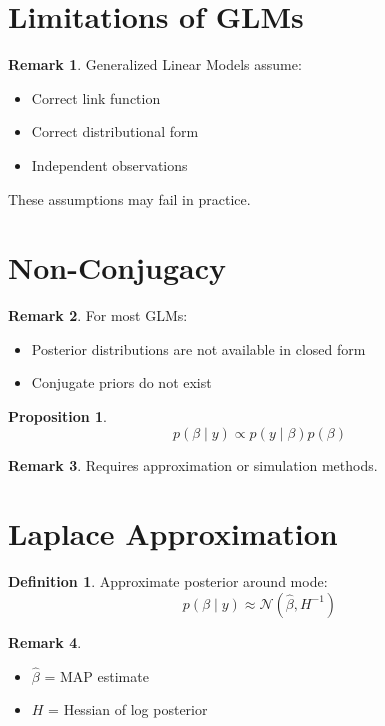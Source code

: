 \documentclass[12pt,oneside]{book}
\numberwithin{equation}{section}
\theoremstyle{definition}
\newtheorem{definition}{Definition}[section]
\newtheorem{remark}{Remark}[section]
\theoremstyle{plain}
\newtheorem{proposition}{Proposition}[section]
\theoremstyle{remark}
\newcommand{\Normal}{\mathcal{N}}
\begin{document}
\section{Limitations of GLMs}

\begin{remark}
Generalized Linear Models assume:
\begin{itemize}
\item Correct link function
\item Correct distributional form
\item Independent observations
\end{itemize}

These assumptions may fail in practice.
\end{remark}

\section{Non-Conjugacy}

\begin{remark}
For most GLMs:
\begin{itemize}
\item Posterior distributions are not available in closed form
\item Conjugate priors do not exist
\end{itemize}
\end{remark}

\begin{proposition}
$$
p(\beta \mid y)
\propto
p(y \mid \beta) p(\beta)
$$
\end{proposition}

\begin{remark}
Requires approximation or simulation methods.
\end{remark}

\section{Laplace Approximation}

\begin{definition}
Approximate posterior around mode:
$$
p(\beta \mid y)
\approx
\Normal(\hat{\beta}, H^{-1})
$$
\end{definition}

\begin{remark}
\begin{itemize}
\item $\hat{\beta}$ = MAP estimate
\item $H$ = Hessian of log posterior
\end{itemize}
\end{remark}
\end{document}
